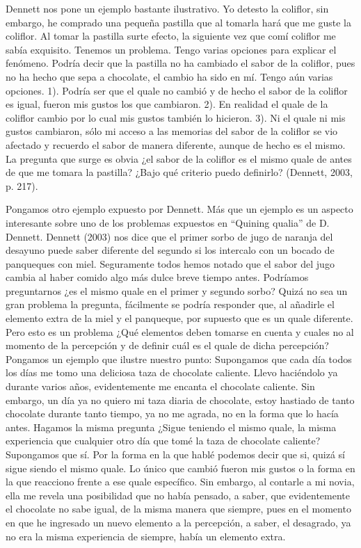 \documentclass[]{book}
\begin{document}
Dennett nos pone un ejemplo bastante ilustrativo. Yo detesto la
coliflor, sin embargo, he comprado una pequeña pastilla que al tomarla
hará que me guste la coliflor. Al tomar la pastilla surte efecto, la
siguiente vez que comí coliflor me sabía exquisito. Tenemos un problema.
Tengo varias opciones para explicar el fenómeno. Podría decir que la
pastilla no ha cambiado el sabor de la coliflor, pues no ha hecho que
sepa a chocolate, el cambio ha sido en mí. Tengo aún varias opciones.
1). Podría ser que el quale no cambió y de hecho el sabor de la coliflor
es igual, fueron mis gustos los que cambiaron. 2). En realidad el quale
de la coliflor cambio por lo cual mis gustos también lo hicieron. 3). Ni
el quale ni mis gustos cambiaron, sólo mi acceso a las memorias del
sabor de la coliflor se vio afectado y recuerdo el sabor de manera
diferente, aunque de hecho es el mismo. La pregunta que surge es obvia
¿el sabor de la coliflor es el mismo quale de antes de que me tomara la
pastilla? ¿Bajo qué criterio puedo definirlo? (Dennett, 2003, p. 217).

Pongamos otro ejemplo expuesto por Dennett. Más que un ejemplo es un
aspecto interesante sobre uno de los problemas expuestos en ``Quining
qualia'' de D. Dennett. Dennett (2003) nos dice que el primer sorbo de
jugo de naranja del desayuno puede saber diferente del segundo si los
intercalo con un bocado de panqueques con miel. Seguramente todos hemos
notado que el sabor del jugo cambia al haber comido algo más dulce breve
tiempo antes. Podríamos preguntarnos ¿es el mismo quale en el primer y
segundo sorbo? Quizá no sea un gran problema la pregunta, fácilmente se
podría responder que, al añadirle el elemento extra de la miel y el
panqueque, por supuesto que es un quale diferente. Pero esto es un
problema ¿Qué elementos deben tomarse en cuenta y cuales no al momento
de la percepción y de definir cuál es el quale de dicha percepción?
Pongamos un ejemplo que ilustre nuestro punto: Supongamos que cada día
todos los días me tomo una deliciosa taza de chocolate caliente. Llevo
haciéndolo ya durante varios años, evidentemente me encanta el chocolate
caliente. Sin embargo, un día ya no quiero mi taza diaria de chocolate,
estoy hastiado de tanto chocolate durante tanto tiempo, ya no me agrada,
no en la forma que lo hacía antes. Hagamos la misma pregunta ¿Sigue
teniendo el mismo quale, la misma experiencia que cualquier otro día que
tomé la taza de chocolate caliente? Supongamos que sí. Por la forma en
la que hablé podemos decir que si, quizá sí sigue siendo el mismo quale.
Lo único que cambió fueron mis gustos o la forma en la que reacciono
frente a ese quale específico. Sin embargo, al contarle a mi novia, ella
me revela una posibilidad que no había pensado, a saber, que
evidentemente el chocolate no sabe igual, de la misma manera que
siempre, pues en el momento en que he ingresado un nuevo elemento a la
percepción, a saber, el desagrado, ya no era la misma experiencia de
siempre, había un elemento extra.
\end{document}
